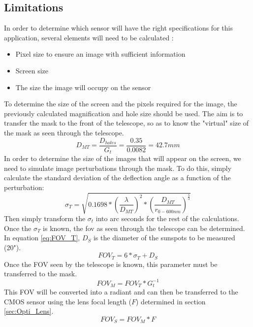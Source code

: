 \subsection{Limitations}
In order to determine which sensor will have the right specifications for this application,
several elements will need to be calculated :
\begin{itemize}
    \item Pixel size to ensure an image with sufficient information
    \item Screen size
    \item The size the image will occupy on the sensor
\end{itemize}
\bigbreak
To determine the size of the screen and the pixels required for the image, the previously
calculated magnification and hole size should be used.
The aim is to transfer the mask to the front of the telescope, so as to know the "virtual" size of the mask as
seen through the telescope.
\begin{equation}\label{eq:DMT}
    D_{MT} = \frac{D_{holes}}{G_t} = \frac{0.35}{0.0082} = 42.7mm
\end{equation}
In order to determine the size of the images that will appear on the screen, we need to simulate image perturbations through the mask.
To do this, simply calculate the standard deviation of the deflection angle as a function of the perturbation:
\begin{equation}\label{eq:Opti_Sigma}
    \sigma_T = \sqrt{0.1698*\left(\frac{\lambda}{D_{MT}}\right)^2*\left(\frac{D_{MT}}{r_{0-600nm}}\right)^{\frac{5}{3}}}
\end{equation}
Then simply transform the $\sigma_t$ into arc seconds for the rest of the calculations.
\newline
Once the $\sigma_T$ is known, the fov as seen through the telescope can be determined. In equation \ref{eq:FOV_T}, $D_S$ is the diameter
of the sunspots to be measured (20").
\begin{equation}\label{eq:FOV_T}
    FOV_T = 6 * \sigma_T + D_S
\end{equation}
Once the FOV seen by the telescope is known, this parameter must be transferred to the mask.
\begin{equation}
    FOV_M = FOV_T * G_t^{-1}
\end{equation}
This FOV will be converted into a radiant and can then be transferred to the CMOS sensor
using the lens focal length ($F$) determined in section \ref{sec:Opti_Lens}.
\begin{equation}
    FOV_S = FOV_M * F
\end{equation}
